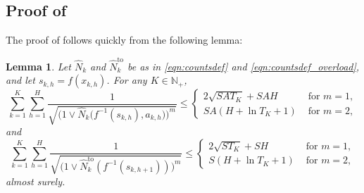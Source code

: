 \documentclass[11pt]{article}
\newcommand{\mbbN}{\mathbb{N}}
\newtheorem{lemma}[theorem]{Lemma}
\theoremstyle{definition}
\theoremstyle{definition}
\begin{document}
\subsection{Proof of \texorpdfstring{}{the final regret term bound}}
\label{sec:proof_of_final_bound_R3}

The proof of  follows quickly from the following lemma:
\begin{lemma}
	\label{lem:pigeonhole}
	Let $\hat{N}_k$ and $\hat{N}_k^{\mathrm{to}}$ be as in \eqref{eqn:countsdef} and \eqref{eqn:countsdef_overload}, and let $s_{k,h}=f(x_{k,h})$.
	For any $K\in \mbbN_+$,
	\begin{equation}
		\label{eqn:pigeonhole_state_action}
		\sum_{k=1}^K
		\sum_{h=1}^H
		\frac{1}{\sqrt{\bigl( 1 \vee \hat{N}_k\bigl( f^{-1}(s_{k,h}),a_{k,h}\bigr) \bigr)^m}}
		\leq
		\begin{cases}
			2\sqrt{SAT_K}+SAH
			 &
			\text{ for } m=1, \\
			SA(H + \ln T_K + 1)
			 &
			\text{ for } m=2,
		\end{cases}
	\end{equation}
	and
	\begin{equation}
		\label{eqn:pigeonhole_next_state}
		\sum_{k=1}^K
		\sum_{h=1}^H
		\frac{1}{\sqrt{\bigl(1 \vee \hat{N}^{\mathrm{to}}_k(f^{-1}(s_{k,h+1})) \bigr)^m}}
		\leq
		\begin{cases}
			2\sqrt{ST_K}+SH
			 &
			\text{ for } m=1, \\
			S(H + \ln T_K + 1)
			 &
			\text{ for } m=2,
		\end{cases}
	\end{equation}
	almost surely.
\end{lemma}
\end{document}
